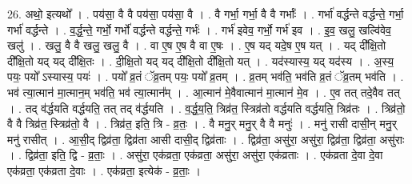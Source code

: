\documentclass[17pt]{extarticle}
\begin{document}
26. अथो॒ इत्यथो᳚ । . पय॑सा॒ वै वै पय॑सा॒ पय॑सा॒ वै । . वै गर्भा॒ गर्भा॒ वै वै गर्भाः᳚ । . गर्भा॑ वर्द्धन्ते वर्द्धन्ते॒ गर्भा॒ गर्भा॑ वर्द्धन्ते । . व॒र्द्ध॒न्ते॒ गर्भो॒ गर्भो॑ वर्द्धन्ते वर्द्धन्ते॒ गर्भः॑ । . गर्भ॑ इवेव॒ गर्भो॒ गर्भ॑ इव । . इ॒व॒ खलु॒ खल्वि॑वेव॒ खलु॑ । . खलु॒ वै वै खलु॒ खलु॒ वै । . वा ए॒ष ए॒ष वै वा ए॒षः । . ए॒ष यद् यदे॒ष ए॒ष यत् । . यद् दी᳚क्षि॒तो दी᳚क्षि॒तो यद् यद् दी᳚क्षि॒तः । . दी॒क्षि॒तो यद् यद् दी᳚क्षि॒तो दी᳚क्षि॒तो यत् । . यद॑स्यास्य॒ यद् यद॑स्य । . अ॒स्य॒ पयः॒ पयो᳚ ऽस्यास्य॒ पयः॑ । . पयो᳚ व्र॒तं ॅव्र॒तम् पयः॒ पयो᳚ व्र॒तम् । . व्र॒तम् भव॑ति॒ भव॑ति व्र॒तं ॅव्र॒तम् भव॑ति । . भव॑ त्या॒त्मान॑ मा॒त्मान॒म् भव॑ति॒ भव॑ त्या॒त्मान᳚म् । . आ॒त्मान॑ मे॒वैवात्मान॑ मा॒त्मान॑ मे॒व । . ए॒व तत् तदे॒वैव तत् । . तद् व॑र्द्धयति वर्द्धयति॒ तत् तद् व॑र्द्धयति । . व॒र्द्ध॒य॒ति॒ त्रिव्र॑त॒ स्त्रिव्र॑तो वर्द्धयति वर्द्धयति॒ त्रिव्र॑तः । . त्रिव्र॑तो॒ वै वै त्रिव्र॑त॒ स्त्रिव्र॑तो॒ वै । . त्रिव्र॑त॒ इति॒ त्रि - व्र॒तः॒ । . वै मनु॒र् मनु॒र् वै वै मनुः॑ । . मनु॑ रासी दासी॒न् मनु॒र् मनु॑ रासीत् । . आ॒सी॒द् द्विव्र॑ता॒ द्विव्र॑ता आसी दासी॒द् द्विव्र॑ताः । . द्विव्र॑ता॒ असु॑रा॒ असु॑रा॒ द्विव्र॑ता॒ द्विव्र॑ता॒ असु॑राः । . द्विव्र॑ता॒ इति॒ द्वि - व्र॒ताः॒ । . असु॑रा॒ एक॑व्रता॒ एक॑व्रता॒ असु॑रा॒ असु॑रा॒ एक॑व्रताः । . एक॑व्रता दे॒वा दे॒वा एक॑व्रता॒ एक॑व्रता दे॒वाः । . एक॑व्रता॒ इत्येक॑ - व्र॒ताः॒ । \newline
\end{document}
